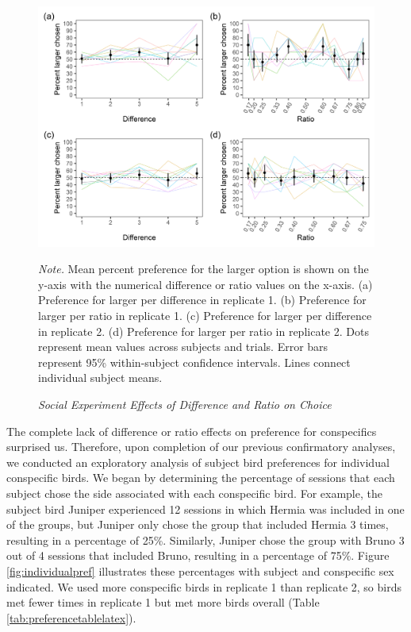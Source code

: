 \documentclass[
  ,pub,floatsintext]{apa6}
\begin{document}
\begin{figure}[t]
\caption{\newline \emph{Social Experiment Effects of Difference and Ratio on Choice} \label{fig:socialgraphs}}
\begin{center}
\includegraphics[width=\linewidth]{"figures/social_figure.png"}
\end{center}

\textit{Note.} Mean percent preference for the larger option is shown on the y-axis with the numerical difference or ratio values on the x-axis. (a) Preference for larger per difference in replicate 1.  (b) Preference for larger per ratio in replicate 1. (c) Preference for larger per difference in replicate 2. (d) Preference for larger per ratio in replicate 2. Dots represent mean values across subjects and trials. Error bars represent 95\% within-subject confidence intervals. Lines connect individual subject means.
\end{figure}

The complete lack of difference or ratio effects on preference for conspecifics surprised us. Therefore, upon completion of our previous confirmatory analyses, we conducted an exploratory analysis of subject bird preferences for individual conspecific birds. We began by determining the percentage of sessions that each subject chose the side associated with each conspecific bird. For example, the subject bird Juniper experienced 12 sessions in which Hermia was included in one of the groups, but Juniper only chose the group that included Hermia 3 times, resulting in a percentage of 25\%. Similarly, Juniper chose the group with Bruno 3 out of 4 sessions that included Bruno, resulting in a percentage of 75\%. Figure \ref{fig:individualpref} illustrates these percentages with subject and conspecific sex indicated. We used more conspecific birds in replicate 1 than replicate 2, so birds met fewer times in replicate 1 but met more birds overall (Table \ref{tab:preferencetablelatex}).
\end{document}
